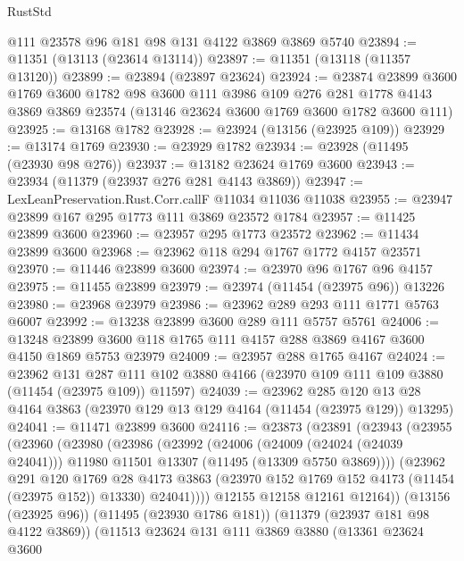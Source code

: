\begin{lexlean}{RustStd}
\begin{coremodule}
    @111
    @23578
    @96
    @181
    @98
    @131
    @4122
    @3869
    @3869
    @5740
@23894 := @11351 (@13113 (@23614 @13114))
@23897 := @11351 (@13118 (@11357 @13120))
@23899 := @23894 (@23897 @23624)
@23924 := @23874
    @23899
    @3600
    @1769
    @3600
    @1782
    @98
    @3600
    @111
    @3986
    @109
    @276
    @281
    @1778
    @4143
    @3869
    @3869
    @23574
    (@13146 @23624 @3600 @1769 @3600 @1782 @3600 @111)
@23925 := @13168 @1782
@23928 := @23924 (@13156 (@23925 @109))
@23929 := @13174 @1769
@23930 := @23929 @1782
@23934 := @23928 (@11495 (@23930 @98 @276))
@23937 := @13182 @23624 @1769 @3600
@23943 := @23934 (@11379 (@23937 @276 @281 @4143 @3869))
@23947 := LexLeanPreservation.Rust.Corr.callF @11034 @11036 @11038
@23955 := @23947 @23899 @167 @295 @1773 @111 @3869 @23572 @1784
@23957 := @11425 @23899 @3600
@23960 := @23957 @295 @1773 @23572
@23962 := @11434 @23899 @3600
@23968 := @23962 @118 @294 @1767 @1772 @4157 @23571
@23970 := @11446 @23899 @3600
@23974 := @23970 @96 @1767 @96 @4157
@23975 := @11455 @23899
@23979 := @23974 (@11454 (@23975 @96)) @13226
@23980 := @23968 @23979
@23986 := @23962 @289 @293 @111 @1771 @5763 @6007
@23992 := @13238 @23899 @3600 @289 @111 @5757 @5761
@24006 := @13248 @23899 @3600 @118 @1765 @111 @4157 @288 @3869 @4167 @3600 @4150 @1869 @5753 @23979
@24009 := @23957 @288 @1765 @4167
@24024 := @23962
    @131
    @287
    @111
    @102
    @3880
    @4166
    (@23970 @109 @111 @109 @3880 (@11454 (@23975 @109)) @11597)
@24039 := @23962
    @285
    @120
    @13
    @28
    @4164
    @3863
    (@23970 @129 @13 @129 @4164 (@11454 (@23975 @129)) @13295)
@24041 := @11471 @23899 @3600
@24116 := @23873
    (@23891
      (@23943
        (@23955
          (@23960
            (@23980
              (@23986
                (@23992
                  (@24006
                    (@24009 (@24024 (@24039 @24041)))
                    @11980
                    @11501
                    @13307
                    (@11495 (@13309 @5750 @3869))))
                (@23962
                  @291
                  @120
                  @1769
                  @28
                  @4173
                  @3863
                  (@23970 @152 @1769 @152 @4173 (@11454 (@23975 @152)) @13330)
                  @24041))))
          @12155
          @12158
          @12161
          @12164))
      (@13156 (@23925 @96))
      (@11495 (@23930 @1786 @181))
      (@11379 (@23937 @181 @98 @4122 @3869))
      (@11513
        @23624
        @131
        @111
        @3869
        @3880
        (@13361
          @23624
          @3600

\end{coremodule}
\end{lexlean}
